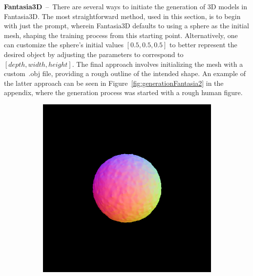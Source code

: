 \indent\textbf{Fantasia3D}~--~There are several ways to initiate the generation of 3D models in Fantasia3D. The most straightforward method, used in this section, is to begin with just the prompt, wherein Fantasia3D defaults to using a sphere as the initial mesh, shaping the training process from this starting point. Alternatively, one can customize the sphere's initial values  \([0.5, 0.5, 0.5]\) to better represent the desired object by adjusting the parameters to correspond to \([depth, width, height]\). The final approach involves initializing the mesh with a custom~.obj file, providing a rough outline of the intended shape. An example of the latter approach can be seen in Figure~\ref{fig:generationFantasia2} in the appendix, where the generation process was started with a rough human figure.

\begin{figure}[H]
    \centering
    \begin{subfigure}[b]{0.20\textwidth}
        \centering
        \fontsize{9pt}{7pt}\selectfont{}\vspace{3cm}
        \fontsize{9pt}{7pt}\selectfont{}\vspace{2.85cm}
        \fontsize{9pt}{7pt}\selectfont{}\vspace{1.95cm}
    \end{subfigure}
    \begin{subfigure}[b]{0.20\textwidth}
        \centering
        \includegraphics[width=\textwidth]{etc/a robot made out of plants/fantasia3d/fantasia_coarse_robot_0_part2.png}

\end{subfigure}
\end{figure}
